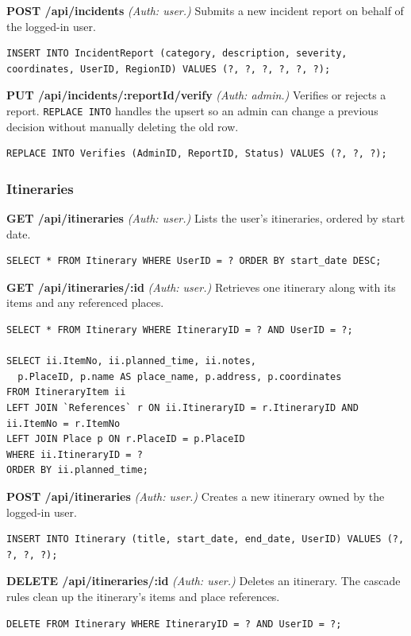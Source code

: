 \textbf{POST /api/incidents} \textit{(Auth: user.)}
Submits a new incident report on behalf of the logged-in user.
\begin{lstlisting}[language=MySQL]
INSERT INTO IncidentReport (category, description, severity, coordinates, UserID, RegionID) VALUES (?, ?, ?, ?, ?, ?);
\end{lstlisting}

\textbf{PUT /api/incidents/:reportId/verify} \textit{(Auth: admin.)}
Verifies or rejects a report. \texttt{REPLACE INTO} handles the upsert so an admin can change a previous decision without manually deleting the old row.
\begin{lstlisting}[language=MySQL]
REPLACE INTO Verifies (AdminID, ReportID, Status) VALUES (?, ?, ?);
\end{lstlisting}

\subsubsection{Itineraries}

\textbf{GET /api/itineraries} \textit{(Auth: user.)}
Lists the user's itineraries, ordered by start date.
\begin{lstlisting}[language=MySQL]
SELECT * FROM Itinerary WHERE UserID = ? ORDER BY start_date DESC;
\end{lstlisting}

\textbf{GET /api/itineraries/:id} \textit{(Auth: user.)}
Retrieves one itinerary along with its items and any referenced places.
\begin{lstlisting}[language=MySQL]
SELECT * FROM Itinerary WHERE ItineraryID = ? AND UserID = ?;

SELECT ii.ItemNo, ii.planned_time, ii.notes,
  p.PlaceID, p.name AS place_name, p.address, p.coordinates
FROM ItineraryItem ii
LEFT JOIN `References` r ON ii.ItineraryID = r.ItineraryID AND ii.ItemNo = r.ItemNo
LEFT JOIN Place p ON r.PlaceID = p.PlaceID
WHERE ii.ItineraryID = ?
ORDER BY ii.planned_time;
\end{lstlisting}

\textbf{POST /api/itineraries} \textit{(Auth: user.)}
Creates a new itinerary owned by the logged-in user.
\begin{lstlisting}[language=MySQL]
INSERT INTO Itinerary (title, start_date, end_date, UserID) VALUES (?, ?, ?, ?);
\end{lstlisting}

\textbf{DELETE /api/itineraries/:id} \textit{(Auth: user.)}
Deletes an itinerary. The cascade rules clean up the itinerary's items and place references.
\begin{lstlisting}[language=MySQL]
DELETE FROM Itinerary WHERE ItineraryID = ? AND UserID = ?;
\end{lstlisting}

